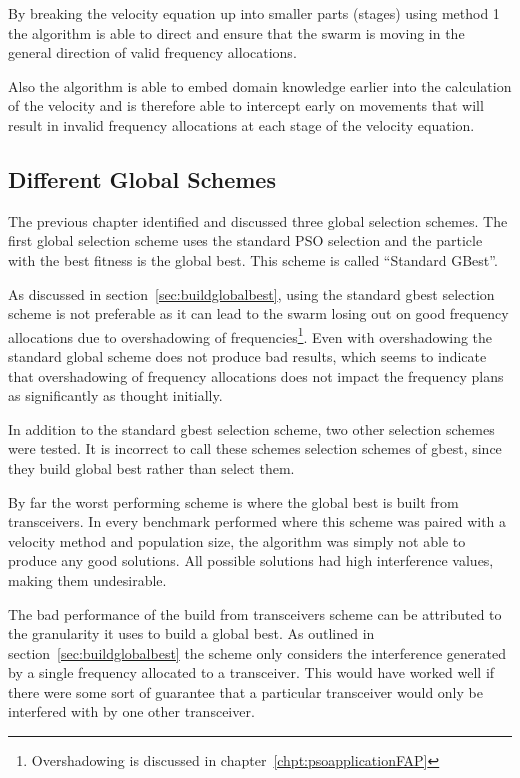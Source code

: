 By breaking the velocity equation up into smaller parts (stages) using method 1 the algorithm is able to direct and ensure that the swarm is moving in the general direction of valid frequency allocations.

Also the algorithm is able to embed domain knowledge earlier into the calculation of the velocity and is therefore able to intercept early on movements that will result in invalid frequency allocations at each stage of the velocity equation.

\subsection{Different Global Schemes}
\label{sec:diffglobalschemes}
The previous chapter identified and discussed three global selection schemes. The first global selection scheme uses the standard PSO selection and the particle with the best fitness is the global best. This scheme is called ``Standard GBest''.

As discussed in section~\ref{sec:buildglobalbest}, using the standard gbest selection scheme is not preferable as it can lead to the swarm losing out on good frequency allocations due to overshadowing of frequencies\footnote{Overshadowing is discussed in chapter~\ref{chpt:psoapplicationFAP}}.
Even with overshadowing the standard global scheme does not produce bad results, which seems to indicate that overshadowing of frequency allocations does not impact the frequency plans as significantly as thought initially.

In addition to the standard gbest selection scheme, two other selection schemes were tested. It is incorrect to call these schemes selection schemes of gbest, since they build global best rather than select them.

By far the worst performing scheme is where the global best is built from transceivers. In every benchmark performed where this scheme was paired with a velocity method and population size, the algorithm was simply not able to produce any good solutions. All possible solutions had high interference values, making them undesirable.

The bad performance of the build from transceivers scheme can be attributed to the granularity it uses to build a global best. As outlined in section~\ref{sec:buildglobalbest} the scheme only considers the interference generated by a single frequency allocated to a transceiver. This would have worked well if there were some sort of guarantee that a particular transceiver would only be interfered with by one other transceiver.


